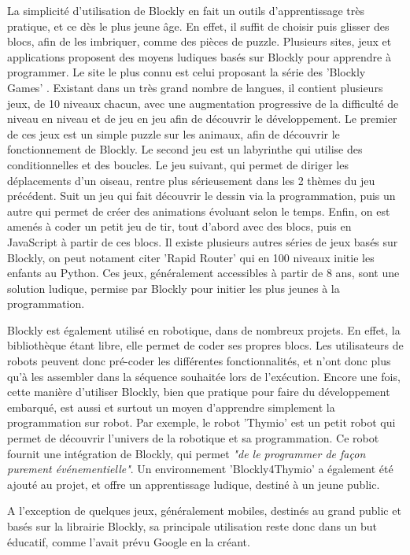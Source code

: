 \documentclass[12pt,francais]{report}
\begin{document}
La simplicité d'utilisation de Blockly en fait un outils d'apprentissage très pratique, et ce dès le plus jeune âge. En effet, il suffit de choisir puis glisser des blocs, afin de les imbriquer, comme des pièces de puzzle. Plusieurs sites, jeux et applications proposent des moyens ludiques basés sur Blockly pour apprendre à programmer. Le site le plus connu est celui proposant la série des 'Blockly Games' \cite{ref12}. Existant dans un très grand nombre de langues, il contient plusieurs jeux, de 10 niveaux chacun, avec une augmentation progressive de la difficulté de niveau en niveau et de jeu en jeu afin de découvrir le développement. Le premier de ces jeux est un simple puzzle sur les animaux, afin de découvrir le fonctionnement de Blockly. Le second jeu est un labyrinthe qui utilise des conditionnelles et des boucles. Le jeu suivant, qui permet de diriger les déplacements d'un oiseau, rentre plus sérieusement dans les 2 thèmes du jeu précédent. Suit un jeu qui fait découvrir le dessin via la programmation, puis un autre qui permet de créer des animations évoluant selon le temps. Enfin, on est amenés à coder un petit jeu de tir, tout d'abord avec des blocs, puis en JavaScript à partir de ces blocs. Il existe plusieurs autres séries de jeux basés sur Blockly, on peut notament citer 'Rapid Router' \cite{ref13} qui en 100 niveaux initie les enfants au Python. Ces jeux, généralement accessibles à partir de 8 ans, sont une solution ludique, permise par Blockly pour initier les plus jeunes à la programmation.

Blockly est également utilisé en robotique, dans de nombreux projets. En effet, la bibliothèque étant libre, elle permet de coder ses propres blocs. Les utilisateurs de robots peuvent donc pré-coder les différentes fonctionnalités, et n'ont donc plus qu'à les assembler dans la séquence souhaitée lors de l'exécution. Encore une fois, cette manière d'utiliser Blockly, bien que pratique pour faire du développement embarqué, est aussi et surtout un moyen d'apprendre simplement la programmation sur robot. Par exemple, le robot 'Thymio' \cite{ref14} est un petit robot qui permet de découvrir l'univers de la robotique et sa programmation. Ce robot fournit une intégration de Blockly, qui permet \textit{"de le programmer de façon purement événementielle"}. Un environnement 'Blockly4Thymio' \cite{ref15} a également été ajouté au projet, et offre un apprentissage ludique, destiné à un jeune public.

A l'exception de quelques jeux, généralement mobiles, destinés au grand public et basés sur la librairie Blockly, sa principale utilisation reste donc dans un but éducatif, comme l'avait prévu Google en la créant.
\end{document}
